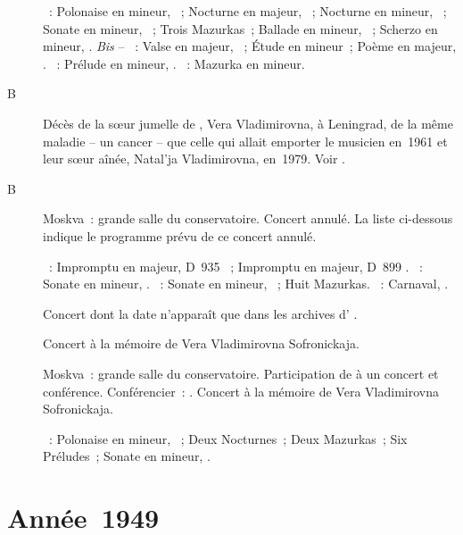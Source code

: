 \begin{description}
 \textsc{\Chopin{}}~: Polonaise en \kC \Sharp mineur,  ~;
 Nocturne en \kF majeur,  ~; Nocturne en \kF \Sharp
 mineur,  ~; Sonate en \kB \Flat mineur, ~;
 Trois Mazurkas~; Ballade en \kG mineur, ~; Scherzo en \kB mineur,
 .
 \emph{Bis} -- \textsc{\Scriabine{}}~: Valse en \kA \Flat majeur,
 ~; Étude en \kB \Flat mineur~; Poème en \kF \Sharp majeur,
  .
 \textsc{\Rachmaninov{}}~: Prélude en \kG mineur,  .
 \textsc{\Chopin{}}~: Mazurka en \kA mineur.
 \item[B\DateWithWeekDay{1948-11-27}]
 Décès de la sœur jumelle de \VSofronitsky{}, Vera Vladimirovna, à
 Leningrad, de la même maladie -- un cancer -- que celle qui allait emporter
 le musicien en~1961 et leur sœur aînée, Natal'ja Vladimirovna, en~1979.
 Voir \citet[p.~118-119, note en bas de page]{Nikonovich08a}.
 \item[B\DateWithWeekDay{1948-11-29}]
 Moskva~: grande salle du conservatoire.
 Concert annulé.
 La liste ci-dessous indique le programme prévu de ce concert annulé.

 \textsc{\Schubert{}}~: Impromptu en \kA \Flat majeur, D~935 ~;
 Impromptu en \kA \Flat majeur, D~899 .
 \textsc{\Beethoven{}}~: Sonate  en \kC \Sharp mineur, 
 .
 \textsc{\Chopin{}}~: Sonate  en \kB \Flat mineur, ~;
 Huit Mazurkas.
 \textsc{\Schumann{}}~: Carnaval, .
 \item[\DateWithWeekDay{1948-12-02}]
 Concert dont la date n'apparaît que dans les archives d'\AVizel{}
 \citep[voir][p.~169]{Nekrasova08}.
 \item[\DateWithWeekDay{1948-12-21}]
 Concert à la mémoire de Vera Vladimirovna Sofronickaja.
 \item[\DateWithWeekDay{1948-12-23}]
 Moskva~: grande salle du conservatoire.
 Participation de \VSofronitsky{} à un concert et conférence.
 Conférencier~: \IMartinov{}.
 Concert à la mémoire de Vera Vladimirovna Sofronickaja.

 \textsc{\Chopin{}}~: Polonaise en \kC \Sharp mineur,  ~;
 Deux Nocturnes~; Deux Mazurkas~; Six Préludes~; Sonate en \kB \Flat mineur,
 .
\end{description}

\section{Année~1949}

